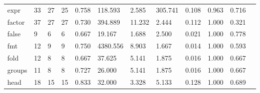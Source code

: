 \begin{longtable}{lp{1.00cm}p{1.00cm}p{1.00cm}p{1.00cm}p{1.00cm}p{1.00cm}p{1.00cm}p{1.00cm}p{1.00cm}p{1.00cm}p{1.00cm}}
expr      &                           33 &                 27 &                                25 &                                      0.758 &                                118.593 &                                        2.585 &                           305.741 &                                   0.108 &                        0.963 &                                        0.716 \\
factor    &                           37 &                 27 &                                27 &                                      0.730 &                                394.889 &                                       11.232 &                             2.444 &                                   0.112 &                        1.000 &                                        0.321 \\
false     &                            9 &                  6 &                                 6 &                                      0.667 &                                 19.167 &                                        1.688 &                             2.500 &                                   0.021 &                        1.000 &                                        0.778 \\
fmt       &                           12 &                  9 &                                 9 &                                      0.750 &                               4380.556 &                                        8.903 &                             1.667 &                                   0.014 &                        1.000 &                                        0.593 \\
fold      &                           12 &                  8 &                                 8 &                                      0.667 &                                 37.625 &                                        5.141 &                             1.875 &                                   0.016 &                        1.000 &                                        0.667 \\
groups    &                           11 &                  8 &                                 8 &                                      0.727 &                                 26.000 &                                        5.141 &                             1.875 &                                   0.016 &                        1.000 &                                        0.667 \\
head      &                           18 &                 15 &                                15 &                                      0.833 &                                 32.000 &                                        3.328 &                             5.133 &                                   0.128 &                        1.000 &                                        0.689 \\

\end{longtable}
